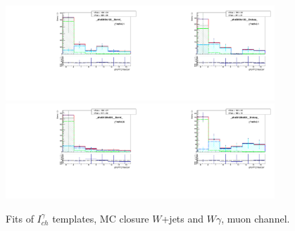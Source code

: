 \begin{figure}[htb]
\begin{center}
   \includegraphics[width=0.45\textwidth]{../figs/figs_v11/MUON_WGamma/MCclosureWjetsPlusWg/c_TEMPL_CHISO_UNblind__phoEt95to120__Barrel__RooFit_MCclosure.pdf}\includegraphics[width=0.45\textwidth]{../figs/figs_v11/MUON_WGamma/MCclosureWjetsPlusWg/c_TEMPL_CHISO_UNblind__phoEt95to120__Endcap__RooFit_MCclosure.pdf}\\
   \includegraphics[width=0.45\textwidth]{../figs/figs_v11/MUON_WGamma/MCclosureWjetsPlusWg/c_TEMPL_CHISO_UNblind__phoEt120to500__Barrel__RooFit_MCclosure.pdf}\includegraphics[width=0.45\textwidth]{../figs/figs_v11/MUON_WGamma/MCclosureWjetsPlusWg/c_TEMPL_CHISO_UNblind__phoEt120to500__Endcap__RooFit_MCclosure.pdf}\\
  \label{fig:templateFits_MCclosureWjetsPlusWg_CHISO_MUON_3}
  \caption{Fits of $I_{ch}^{\gamma}$ templates, MC closure $W$+jets and $W\gamma$, muon channel.}
  \end{center}
\end{figure}

